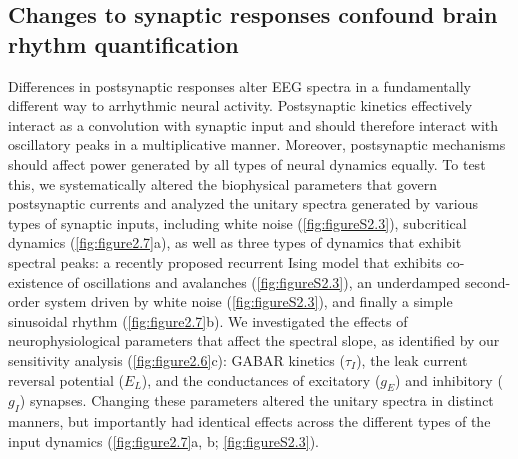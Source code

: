 \subsection{Changes to synaptic responses confound brain rhythm quantification}
Differences in postsynaptic responses alter EEG spectra in a fundamentally different way to arrhythmic neural activity. Postsynaptic kinetics effectively interact as a convolution with synaptic input and should therefore interact with oscillatory peaks in a multiplicative manner. Moreover, postsynaptic mechanisms should affect power generated by all types of neural dynamics equally. To test this, we systematically altered the biophysical parameters that govern postsynaptic currents and analyzed the unitary spectra generated by various types of synaptic inputs, including white noise (\autoref{fig:figureS2.3}), subcritical dynamics (\autoref{fig:figure2.7}a), as well as three types of dynamics that exhibit spectral peaks: a recently proposed recurrent Ising model that exhibits co-existence of oscillations and avalanches\cite{Lombardi2023} (\autoref{fig:figureS2.3}), an underdamped second-order system driven by white noise (\autoref{fig:figureS2.3}), and finally a simple sinusoidal rhythm (\autoref{fig:figure2.7}b). We investigated the effects of neurophysiological parameters that affect the spectral slope, as identified by our sensitivity analysis (\autoref{fig:figure2.6}c): GABAR kinetics ($\tau_I$), the leak current reversal potential ($E_L$), and the conductances of excitatory ($g_E$) and inhibitory ($g_I$) synapses. Changing these parameters altered the unitary spectra in distinct manners, but importantly had identical effects across the different types of the input dynamics (\autoref{fig:figure2.7}a, b; \autoref{fig:figureS2.3}). 


